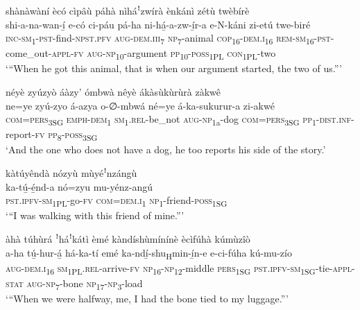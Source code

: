 shànàwàní ècó cìpâù páhà nìháꜝzwírà ènkánì zétù twèbírè\\
\gll shi-a-na-wan-í̲      e-có    ci-páu    pá-ha ni-há̲-a-zw-í̲r-a         e-N-káni      zi-etú    twe-biré\\
\textsc{inc}{}-\textsc{sm}\textsubscript{1}{}-\textsc{pst}{}-find-\textsc{npst}.\textsc{pfv}  \textsc{aug}{}-\textsc{dem}.\textsc{iii}\textsubscript{7}  \textsc{np}\textsubscript{7}{}-animal  \textsc{cop}\textsubscript{16}{}-\textsc{dem}.\textsc{i}\textsubscript{16}
\textsc{rem}{}-\textsc{sm}\textsubscript{16}{}-\textsc{pst}{}-come\_out-\textsc{appl}{}-\textsc{fv}  \textsc{aug}{}-\textsc{np}\textsubscript{10}{}-argument  \textsc{pp}\textsubscript{10}{}-\textsc{poss}\textsubscript{1PL}
\textsc{con}\-\textsubscript{1PL}{}-two\\
\glt ‘“When he got this animal, that is when our argument started, the two of us.”’\bigskip

néyè zyúzyò áàzy’ ómbwà nêyè ákàsùkùrùrà zàkwê\\
\gll ne=ye    zyú-zyo  á-azya      o-∅-mbwá né=ye    á-ka-sukurur-a    zi-akwé \\
\textsc{com}=\textsc{pers}\textsubscript{3SG}  \textsc{emph}{}-\textsc{dem}\textsubscript{1}  \textsc{sm}\textsubscript{1}.\textsc{rel}{}-be\_not  \textsc{aug}{}-\textsc{np}\textsubscript{1a}{}-dog
\textsc{com}=\textsc{pers}\textsubscript{3SG}  \textsc{pp}\textsubscript{1}{}-\textsc{dist}.\textsc{inf}{}-report-\textsc{fv}  \textsc{pp}\textsubscript{8}{}-\textsc{poss}\textsubscript{3SG}\\
\glt ‘And the one who does not have a dog, he too reports his side of the story.’\bigskip

\newpage
kàtúyêndà nózyù mùyéꜝnzángù\\
\gll ka-tú̲-é̲nd-a      nó=zyu  mu-yénz-angú\\
\textsc{pst}.\textsc{ipfv}{}-\textsc{sm}\textsubscript{1PL}{}-go-\textsc{fv}  \textsc{com}=\textsc{dem}.\textsc{i}\textsubscript{1}  \textsc{np}\textsubscript{1}{}-friend-\textsc{poss}\textsubscript{1SG}\\
\glt ‘“I was walking with this friend of mine.”’\bigskip

àhà túhùrá ꜝháꜝkátì èmé kàndíshùmínínè ècìfúhà kúmùzîò\\
\gll a-ha    tú̲-hur-á̲    há-ka-tí emé    ka-ndí̲-shu\textsubscript{H}min-í̲n-e    e-ci-fúha    kú-mu-zío\\
\textsc{aug}{}-\textsc{dem}.\textsc{i}\textsubscript{16}  \textsc{sm}\textsubscript{1PL}.\textsc{rel}{}-arrive-\textsc{fv}  \textsc{np}\textsubscript{16}{}-\textsc{np}\textsubscript{12}{}-middle
\textsc{pers}\textsubscript{1SG}  \textsc{pst}.\textsc{ipfv}{}-\textsc{sm}\textsubscript{1SG}{}-tie-\textsc{appl}{}-\textsc{stat}  \textsc{aug}{}-\textsc{np}\textsubscript{7}{}-bone  \textsc{np}\textsubscript{17}{}-\textsc{np}\textsubscript{3}{}-load\\
\glt ‘“When we were halfway, me, I had the bone tied to my luggage.”’\bigskip

